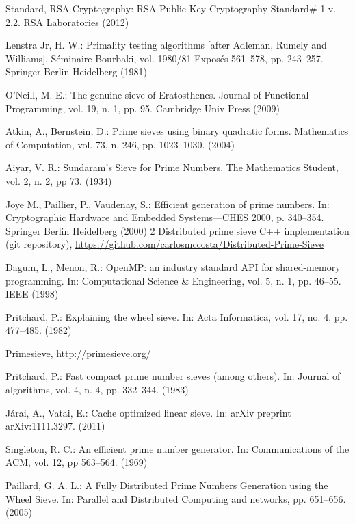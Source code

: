 \documentclass[runningheads,a4paper]{llncs}
\begin{document}
\begin{thebibliography}{4}

 Standard, RSA Cryptography: RSA Public Key Cryptography Standard\# 1 v. 2.2. RSA Laboratories (2012)

 Lenstra Jr, H. W.: Primality testing algorithms [after Adleman, Rumely and Williams]. Séminaire Bourbaki, vol. 1980/81 Exposés 561–578, pp. 243--257. Springer Berlin Heidelberg (1981)

 O'Neill, M. E.: The genuine sieve of Eratosthenes. Journal of Functional Programming, vol. 19, n. 1, pp. 95. Cambridge Univ Press (2009)

 Atkin, A., Bernstein, D.: Prime sieves using binary quadratic forms. Mathematics of Computation, vol. 73, n. 246, pp. 1023--1030. (2004)

 Aiyar, V. R.: Sundaram's Sieve for Prime Numbers. The Mathematics Student, vol. 2, n. 2, pp 73. (1934)

 Joye M., Paillier, P., Vaudenay, S.: Efficient generation of prime numbers. In: Cryptographic Hardware and Embedded Systems—CHES 2000, p. 340--354. Springer Berlin Heidelberg (2000)
2
 Distributed prime sieve C++ implementation (git repository), \url{https://github.com/carlosmccosta/Distributed-Prime-Sieve}

 Dagum, L., Menon, R.:  OpenMP: an industry standard API for shared-memory programming. In: Computational Science \& Engineering, vol. 5, n. 1, pp. 46--55. IEEE (1998)

 Pritchard, P.: Explaining the wheel sieve. In: Acta Informatica, vol. 17, no. 4, pp. 477--485. (1982)

 Primesieve, \url{http://primesieve.org/}

 Pritchard, P.: Fast compact prime number sieves (among others). In: Journal of algorithms, vol. 4, n. 4, pp. 332--344. (1983)

 J\'{a}rai, A., Vatai, E.: Cache optimized linear sieve. In: arXiv preprint arXiv:1111.3297. (2011)

 Singleton, R. C.: An efficient prime number generator. In: Communications of the ACM, vol. 12, pp 563--564. (1969)

 Paillard, G. A. L.: A Fully Distributed Prime Numbers Generation using the Wheel Sieve. In: Parallel and Distributed Computing and networks, pp. 651--656. (2005)


\end{thebibliography}
\end{document}
